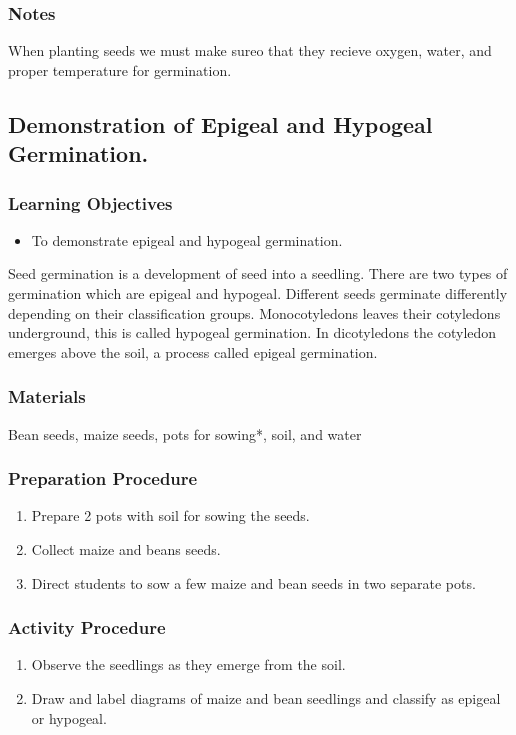 \subsubsection*{Notes}
When planting seeds we must make sureo that they recieve oxygen, water, and proper temperature for germination.


\subsection{Demonstration of Epigeal and Hypogeal Germination.}

\subsubsection*{Learning Objectives}
\begin{itemize}
\item{To demonstrate epigeal and hypogeal germination.}
\end{itemize}


Seed germination is a development of seed into a seedling. There are two types of germination which are epigeal and hypogeal. Different seeds germinate differently depending on their classification groups.  Monocotyledons leaves their cotyledons underground, this is called hypogeal germination. In dicotyledons the cotyledon emerges above the soil, a process called epigeal germination.

\subsubsection*{Materials}
Bean seeds, maize seeds, pots for sowing*, soil, and water

\subsubsection*{Preparation Procedure}
\begin{enumerate}
\item{Prepare 2 pots with soil for sowing the seeds.}
\item{Collect maize and beans seeds.}
\item{Direct students to sow a few maize and bean seeds in two separate pots.}
\end{enumerate}

\subsubsection*{Activity Procedure}
\begin{enumerate}
\item{Observe the seedlings as they emerge from the soil.}
\item{Draw and label diagrams of maize and bean seedlings and classify as epigeal or hypogeal.}
\end{enumerate}


